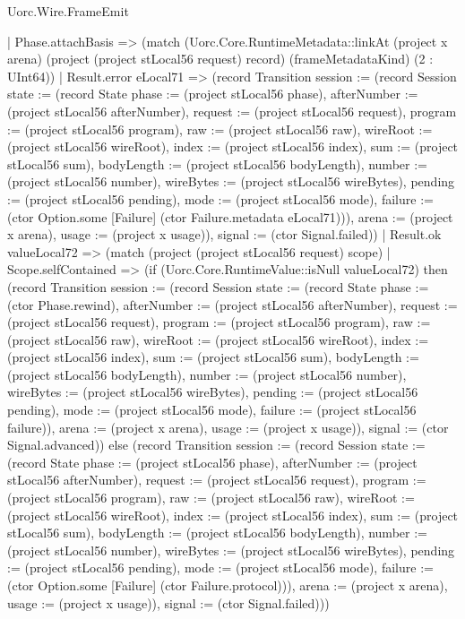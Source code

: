 \begin{lexlean}{Uorc.Wire.FrameEmit}
\begin{semanticmodule}
{        | Phase.attachBasis => (match (Uorc.Core.RuntimeMetadata::linkAt (project x arena) (project (project stLocal56 request) record) (frameMetadataKind) (2 : UInt64))
          | Result.error eLocal71 => (record Transition {session := (record Session {state := (record State {phase := (project stLocal56 phase), afterNumber := (project stLocal56 afterNumber), request := (project stLocal56 request), program := (project stLocal56 program), raw := (project stLocal56 raw), wireRoot := (project stLocal56 wireRoot), index := (project stLocal56 index), sum := (project stLocal56 sum), bodyLength := (project stLocal56 bodyLength), number := (project stLocal56 number), wireBytes := (project stLocal56 wireBytes), pending := (project stLocal56 pending), mode := (project stLocal56 mode), failure := (ctor Option.some [Failure] (ctor Failure.metadata eLocal71))}), arena := (project x arena), usage := (project x usage)}), signal := (ctor Signal.failed)})
          | Result.ok valueLocal72 => (match (project (project stLocal56 request) scope)
            | Scope.selfContained => (if (Uorc.Core.RuntimeValue::isNull valueLocal72) then (record Transition {session := (record Session {state := (record State {phase := (ctor Phase.rewind), afterNumber := (project stLocal56 afterNumber), request := (project stLocal56 request), program := (project stLocal56 program), raw := (project stLocal56 raw), wireRoot := (project stLocal56 wireRoot), index := (project stLocal56 index), sum := (project stLocal56 sum), bodyLength := (project stLocal56 bodyLength), number := (project stLocal56 number), wireBytes := (project stLocal56 wireBytes), pending := (project stLocal56 pending), mode := (project stLocal56 mode), failure := (project stLocal56 failure)}), arena := (project x arena), usage := (project x usage)}), signal := (ctor Signal.advanced)}) else (record Transition {session := (record Session {state := (record State {phase := (project stLocal56 phase), afterNumber := (project stLocal56 afterNumber), request := (project stLocal56 request), program := (project stLocal56 program), raw := (project stLocal56 raw), wireRoot := (project stLocal56 wireRoot), index := (project stLocal56 index), sum := (project stLocal56 sum), bodyLength := (project stLocal56 bodyLength), number := (project stLocal56 number), wireBytes := (project stLocal56 wireBytes), pending := (project stLocal56 pending), mode := (project stLocal56 mode), failure := (ctor Option.some [Failure] (ctor Failure.protocol))}), arena := (project x arena), usage := (project x usage)}), signal := (ctor Signal.failed)}))
}
\end{semanticmodule}
\end{lexlean}
